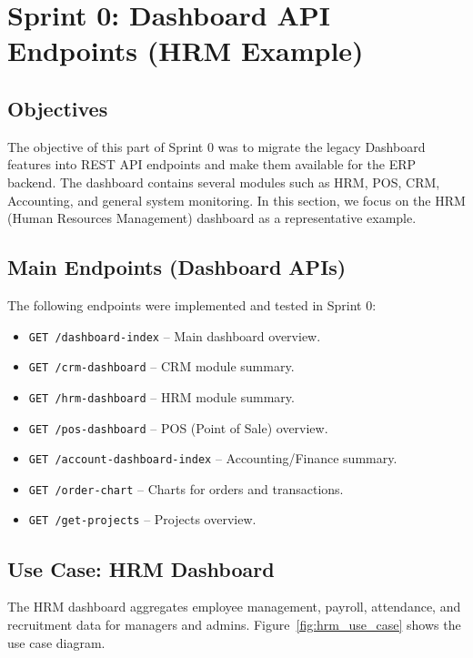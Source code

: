 \section{Sprint 0: Dashboard API Endpoints (HRM Example)}

\subsection{Objectives}
The objective of this part of Sprint 0 was to migrate the legacy Dashboard features into REST API endpoints and make them available for the ERP backend.  
The dashboard contains several modules such as HRM, POS, CRM, Accounting, and general system monitoring. In this section, we focus on the HRM (Human Resources Management) dashboard as a representative example.

\subsection{Main Endpoints (Dashboard APIs)}
The following endpoints were implemented and tested in Sprint 0:
\begin{itemize}
    \item \texttt{GET /dashboard-index} – Main dashboard overview.
    \item \texttt{GET /crm-dashboard} – CRM module summary.
    \item \texttt{GET /hrm-dashboard} – HRM module summary.
    \item \texttt{GET /pos-dashboard} – POS (Point of Sale) overview.
    \item \texttt{GET /account-dashboard-index} – Accounting/Finance summary.
    \item \texttt{GET /order-chart} – Charts for orders and transactions.
    \item \texttt{GET /get-projects} – Projects overview.
\end{itemize}

\subsection{Use Case: HRM Dashboard}
The HRM dashboard aggregates employee management, payroll, attendance, and recruitment data for managers and admins. Figure~\ref{fig:hrm_use_case} shows the use case diagram.

